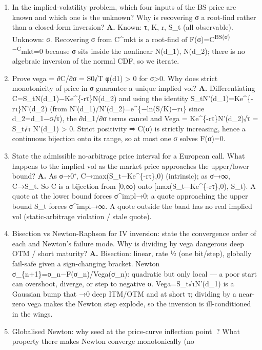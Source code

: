 \documentclass[
  11pt,
]{article}
\providecommand{\tightlist}{%
  \setlength{\itemsep}{0pt}\setlength{\parskip}{0pt}}
\begin{document}
\begin{enumerate}
\def\labelenumi{\arabic{enumi}.}
\tightlist
\item
  In the implied-volatility problem, which four inputs of the BS price
  are known and which one is the unknown? Why is recovering σ a
  root-find rather than a closed-form inversion? \textbf{A.} Known: τ,
  K, r, S\_t (all observable). Unknown: σ. Recovering σ from C\^{}mkt is
  a root-find of F(σ)=C\textsuperscript{BS(σ)−C}mkt=0 because σ sits
  inside the nonlinear N(d\_1), N(d\_2); there is no algebraic inversion
  of the normal CDF, so we iterate.
\item
  Prove vega = ∂C/∂σ = S0√T φ(d1) \textgreater{} 0 for σ\textgreater0.
  Why does strict monotonicity of price in σ guarantee a unique implied
  vol? \textbf{A.} Differentiating C=S\_tN(d\_1)−Ke\^{}\{-rτ\}N(d\_2)
  and using the identity S\_tN'(d\_1)=Ke\^{}\{-rτ\}N'(d\_2) (from
  N'(d\_1)/N'(d\_2)=e\^{}\{−ln(S/K)−rτ\} since d\_2=d\_1−σ√τ), the
  ∂d\_1/∂σ terms cancel and Vega = Ke\^{}\{-rτ\}N'(d\_2)√τ = S\_t√τ
  N'(d\_1) \textgreater{} 0. Strict positivity ⇒ C(σ) is strictly
  increasing, hence a continuous bijection onto its range, so at most
  one σ solves F(σ)=0.
\item
  State the admissible no-arbitrage price interval for a European call.
  What happens to the implied vol as the market price approaches the
  upper/lower bound? \textbf{A.} As σ→0⁺, C→max(S\_t−Ke\^{}\{-rτ\},0)
  (intrinsic); as σ→∞, C→S\_t. So C is a bijection from {[}0,∞) onto
  {[}max(S\_t−Ke\^{}\{-rτ\},0), S\_t). A quote at the lower bound forces
  σ\^{}impl→0; a quote approaching the upper bound S\_t forces
  σ\^{}impl→∞. A quote outside the band has no real implied vol
  (static-arbitrage violation / stale quote).
\item
  Bisection vs Newton-Raphson for IV inversion: state the convergence
  order of each and Newton's failure mode. Why is dividing by vega
  dangerous deep OTM / short maturity? \textbf{A.} Bisection: linear,
  rate ½ (one bit/step), globally fail-safe given a sign-changing
  bracket. Newton σ\_\{n+1\}=σ\_n−F(σ\_n)/Vega(σ\_n): quadratic but only
  local --- a poor start can overshoot, diverge, or step to negative σ.
  Vega=S\_t√τN'(d\_1) is a Gaussian bump that →0 deep ITM/OTM and at
  short τ; dividing by a near-zero vega makes the Newton step explode,
  so the inversion is ill-conditioned in the wings.
\item
  Globalised Newton: why seed at the price-curve inflection point ?
  What property there makes Newton converge monotonically (no

\end{enumerate}
\end{document}

